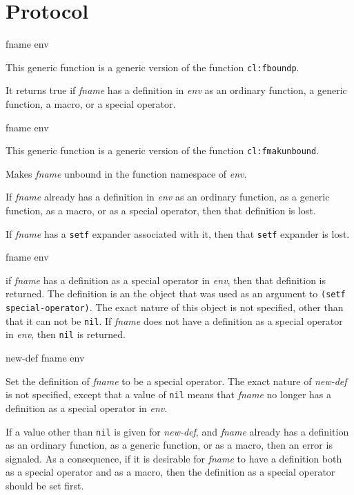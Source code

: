 \appendix

\section{Protocol}

 {fname env}

This generic function is a generic version of the \commonlisp{}
function \texttt{cl:fboundp}.

It returns true if \textit{fname} has a definition in
\textit{env} as an ordinary function, a generic function, a
macro, or a special operator.

 {fname env}

This generic function is a generic version of the \commonlisp{}
function \texttt{cl:fmakunbound}.

Makes \textit{fname} unbound in the function namespace of
\textit{env}.

If \textit{fname} already has a definition in
\textit{env} as an ordinary function, as a generic function,
as a macro, or as a special operator, then that definition is lost.

If \textit{fname} has a \texttt{setf} expander associated with
it, then that \texttt{setf} expander is lost.

 {fname env}

if \textit{fname} has a definition as a special operator in
\textit{env}, then that definition is returned.  The definition is an
the object that was used as an argument to \texttt{(setf
  special-operator)}.  The exact nature of this object is not
specified, other than that it can not be \texttt{nil}.  If
\textit{fname} does not have a definition as a special operator in
\textit{env}, then \texttt{nil} is returned.

 {new-def fname env}

Set the definition of \textit{fname} to be a special operator.  The
exact nature of \textit{new-def} is not specified, except that a value
of \texttt{nil} means that \textit{fname} no longer has a definition
as a special operator in \textit{env}.

If a value other than \texttt{nil} is given for \textit{new-def}, and
\textit{fname} already has a definition as an ordinary function, as a
generic function, or as a macro, then an error is signaled.  As a
consequence, if it is desirable for \textit{fname} to have a
definition both as a special operator and as a macro, then the
definition as a special operator should be set first.

